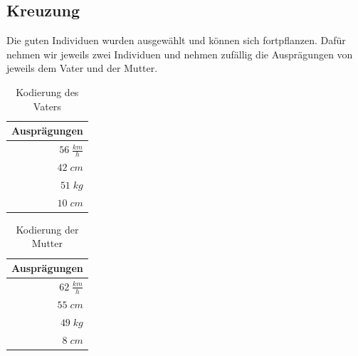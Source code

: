         \subsection{Kreuzung}
            
            Die guten Individuen wurden ausgewählt und können sich fortpflanzen. Dafür nehmen wir jeweils zwei Individuen und nehmen zufällig die Ausprägungen von jeweils dem Vater und der Mutter. 
            \\[10mm]
            \begin{multicols}{2}
                \begin{table}[H]
                    \begin{center}
                    \begin{tabular}{ |r| } 
                        \hline
                        \hfill Ausprägungen  \\ \hline
                        \cellcolor{blue!25} $ 56\; \frac{km}{h}$ \\ \hline
                        \cellcolor{blue!25} $ 42\; cm          $ \\ \hline
                        \cellcolor{blue!25} $ 51\; kg          $ \\ \hline
                        \cellcolor{blue!25} $ 10\; cm          $ \\ \hline
                    \end{tabular}
                    \end{center}
                    \caption{Kodierung des Vaters \label{fig:somelabel}}
                \end{table}

                \begin{table}[H]
                    \begin{center}
                    \begin{tabular}{ |r| } 
                        \hline
                        \hfill Ausprägungen  \\ \hline
                        \cellcolor{yellow!25} $ 62\; \frac{km}{h}$ \\ \hline
                        \cellcolor{yellow!25} $ 55\; cm          $ \\ \hline
                        \cellcolor{yellow!25} $ 49\; kg          $ \\ \hline
                        \cellcolor{yellow!25} $  8\; cm          $ \\ \hline
                    \end{tabular}
                    \end{center}
                    \caption{Kodierung der Mutter \label{fig:somelabel}}
                \end{table}

            \end{multicols}

